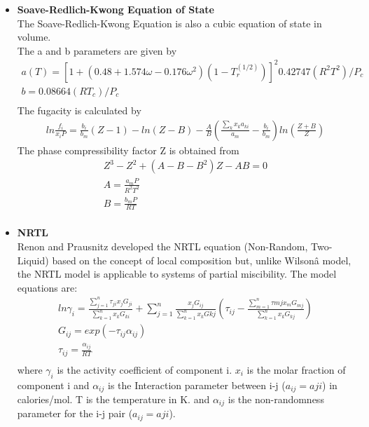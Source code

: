 \documentclass[12pt]{report}
\begin{document}
\begin{itemize}
\item {\textbf{Soave-Redlich-Kwong Equation of State}} \\
The Soave-Redlich-Kwong Equation \cite{SRK} is also a cubic equation of state in volume. \\
The a and b parameters are given by
\begin{gather*}
a(T) = [1 + (0.48 + 1.574\omega - 0.176\omega^2)(1-T_r^{(1/2)})]^{2}0.42747(R^2T^2)/P_c \\
b = 0.08664(RT_c)/P_c \\
\end{gather*}
The fugacity is calculated by
\begin{gather*}
ln\frac{f_i}{x_iP} = \frac{b_i}{b_m}(Z-1) - ln(Z-B) - \frac{A}{B}(\frac{\sum_kx_ka_{ki}}{a_m} - \frac{b_i}{b_m})ln(\frac{Z+B}{Z})
\end{gather*}
The phase compressibility factor Z is obtained from 
\begin{gather*}
Z^3 - Z^2 + (A - B - B^2)Z - AB = 0 \\
A = \frac{a_mP}{R^2T^2} \\
B = \frac{b_mP}{RT} \\
\end{gather*}

\item{\textbf{NRTL}}\\
Renon and Prausnitz \cite{NRTL} developed the NRTL equation (Non-Random, Two-Liquid) based on the concept of local composition but, unlike Wilsonâ  model, the NRTL model is applicable to systems of partial miscibility. The model equations are:
\begin{gather*}
ln\gamma_i = \frac{\sum_{j=1}^{n}\tau_{ji}x_jG_{ji}}{\sum_{k=1}^{n}x_kG_{ki}} + \sum_{j=1}^{n}\frac{x_jG_{ij}}{\sum_{k=1}^{n}x_kG{kj}}(\tau_{ij} - \frac{\sum_{m=1}^{n}\tau{mj}x_mG_{mj}}{\sum_{k=1}^{n}x_kG_{kj}}) \\
G_{ij} = exp(-\tau_{ij}\alpha_{ij}) \\
\tau_{ij} = \frac{\alpha_{ij}}{RT} \\
\end{gather*}
where $\gamma_i$ is the activity coefficient of component i. $x_i$ is the molar fraction of component i and $\alpha_{ij}$ is the Interaction parameter between i-j ($a_{ij} = a{ji}$) in calories/mol. T is the  temperature in K. and $\alpha_{ij}$ is the non-randomness parameter for the i-j pair ($a_{ij} = a{ji}$).

\end{itemize}
\end{document}
